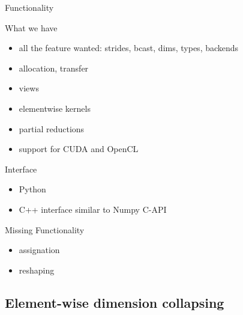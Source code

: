 \documentclass[utf8x,xcolor=pdftex,dvipsnames,table]{beamer}
\begin{document}
\begin{frame}{Functionality}
\begin{block}{What we have}
\begin{itemize}
\item all the feature wanted: strides, bcast, dims, types, backends
\item allocation, transfer
\item views
\item elementwise kernels
\item partial reductions
\item support for CUDA and OpenCL
\end{itemize}
\end{block}
\begin{block}{Interface}
\begin{itemize}
\item Python
\item C++ interface similar to Numpy C-API
\end{itemize}
\end{block}
\end{frame}

\begin{frame}{Missing Functionality}
\begin{itemize}
\item assignation
\item reshaping
\end{itemize}
\end{frame}

\subsection{Element-wise dimension collapsing}
\end{document}
